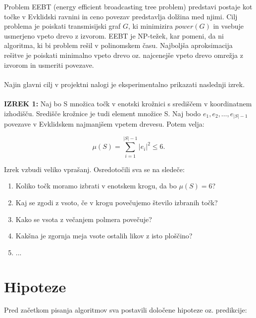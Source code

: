 \documentclass[a4paper]{report}
\begin{document}
Problem EEBT (energy efficient broadcasting tree problem) predstavi postaje kot točke v Evklidski ravnini in ceno povezav predstavlja dolžina med njimi. Cilj problema je poiskati transmisijski graf $G$, ki minimizira $power(G)$ in vsebuje usmerjeno vpeto drevo z izvorom. EEBT je NP-težek, kar pomeni, da ni algoritma, ki bi problem rešil v polinomskem času. Najboljša aproksimacija rešitve je poiskati minimalno vpeto drevo oz. najcenejše vpeto drevo omrežja z izvorom in usmeriti povezave.
\\
\\
Najin glavni cilj v projektni nalogi je eksperimentalno prikazati naslednji izrek.\\
\\
\textbf{IZREK 1:} Naj bo S množica točk v enotski krožnici s središčem v koordinatnem izhodišču. Središče krožnice je tudi element množice S. Naj bodo $e_1, e_2, \ldots, e_{|S|-1}$ povezave v Evklidskem najmanjšem vpetem drevesu. Potem velja: 

$$ \mu (S) = \sum_{i=1}^{|S|-1} |e_i|^2 \leq 6. $$

Izrek vzbudi veliko vprašanj. Osredotočili sva se na sledeče:
\begin{enumerate}
\item Koliko točk moramo izbrati v enotskem krogu, da bo $\mu (S) = 6$?
\item Kaj se zgodi z vsoto, če v krogu povečujemo število izbranih točk?
\item Kako se vsota z večanjem polmera povečuje?
\item Kakšna je zgornja meja vsote ostalih likov z isto ploščino?
\item ...
\end{enumerate}

\section{Hipoteze}

Pred začetkom pisanja algoritmov sva postavili določene hipoteze oz. predikcije:
\end{document}
